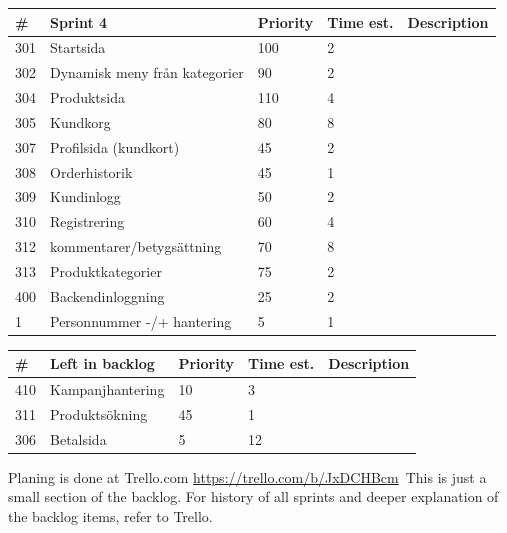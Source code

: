 \documentclass[paper=a4, fontsize=11pt]{report} %
\begin{document}
\begin{itemize}
	\begin{tabular}{|l|l|l|l|l|}
		\hline
		 \#  & Sprint 4                      & Priority & Time est. & Description \\ \hline
		 301 & Startsida                     & 100      & 2         &             \\ \hline
		 302 & Dynamisk meny från kategorier & 90       & 2         &             \\ \hline
		 304 & Produktsida                   & 110      & 4         &             \\ \hline
		 305 & Kundkorg                      & 80       & 8         &             \\ \hline
		 307 & Profilsida (kundkort)         & 45       & 2         &             \\ \hline
		 308 & Orderhistorik                 & 45       & 1         &             \\ \hline
		 309 & Kundinlogg                    & 50       & 2         &             \\ \hline
		 310 & Registrering                  & 60       & 4         &             \\ \hline
		 312 & kommentarer/betygsättning     & 70       & 8         &             \\ \hline
		 313 & Produktkategorier             & 75       & 2         &             \\ \hline
		 400 & Backendinloggning             & 25       & 2         &             \\ \hline
		 1   & Personnummer -/+ hantering    & 5        & 1         &             \\ \hline
	\end{tabular}

	\begin{tabular}{|l|l|l|l|l|}
		 \hline
		 \#  & Left in backlog  & Priority & Time est. & Description \\ \hline
		 410 & Kampanjhantering & 10       & 3         &             \\ \hline
		 311 & Produktsökning   & 45       & 1         &             \\ \hline
		 306 & Betalsida        & 5        & 12        &             \\ \hline
	\end{tabular}


	Planing is done at Trello.com
	\url{https://trello.com/b/JxDCHBcm}\
	This is just a small section of the backlog. For history of all sprints and deeper
	explanation of the backlog items, refer to Trello.


\end{itemize}
\end{document}
